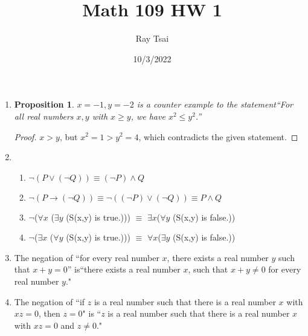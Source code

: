 \documentclass{article}
\title{Math 109 HW 1}
\author{Ray Tsai}
\date{10/3/2022}
\newtheorem{prop}[thm]{Proposition}
\begin{document}
\maketitle

\begin{enumerate}
\item \begin{prop}
$x = -1, y = -2$ is a counter example to the statement``For all real numbers $x, y$ with $x \geq y$, we have $x^2 \leq y^2$.”
\end{prop}
\begin{proof}
$x > y$, but $x^2 = 1 > y^2 = 4$, which contradicts the given statement.
\end{proof}

\item 
\begin{enumerate}
    \item $\neg(P \vee (\neg Q)) \equiv (\neg P) \wedge Q$
    \item $\neg(P \rightarrow (\neg Q)) \equiv \neg((\neg P) \vee (\neg Q)) \equiv P \wedge Q$
    \item $\neg$($\forall x$ ($\exists y$ (S(x,y) is true.))) $\equiv$ $\exists x$($\forall y$ (S(x,y) is false.))
    \item $\neg$($\exists x$ ($\forall y$ (S(x,y) is true.))) $\equiv$ $\forall x$($\exists y$ (S(x,y) is false.))
\end{enumerate}

\item 
The negation of ``for every real number $x$, there exists a real number $y$ such that $x + y = 0$” is``there exists a real number $x$, such that $x + y \neq 0$ for every real number $y$."


\item 
The negation of ``if $z$ is a real number such that there is a real number $x$ with $xz = 0$, then $z = 0$" is ``$z$ is a real number such that there is a real number $x$ with $xz = 0$ and $z \neq 0$."


\end{enumerate}
\end{document}
